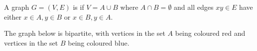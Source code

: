 \begin{definition}
	A graph $G = (V, E)$ is  if $V = A \cup B$ where $A \cap B = \emptyset$ and all edges $xy \in E$ have either $x \in A, y \in B$ or $x \in B, y \in A$.
\end{definition}

\begin{example}
	The graph below is bipartite, with vertices in the set $A$ being coloured red and vertices in the set $B$ being coloured blue.
	\begin{center}
		


\begin{tikzpicture}[x=0.75pt,y=0.75pt,yscale=-1,xscale=1]


\end{tikzpicture}
\end{center}
\end{example}
